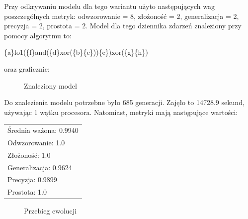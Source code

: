 Przy odkrywaniu modelu dla tego wariantu użyto następujących wag poszczególnych metryk: odwzorowanie = 8, złożoność = 2, generalizacja = 2, precyzja = 2, prostota = 2. Model dla tego dziennika zdarzeń znaleziony przy pomocy algorytmu to:
\begin{center}
	\{a\}lo1(\{f\}and(\{d\}xor(\{b\}\{c\}))\{e\})xor(\{g\}\{h\})
\end{center}
oraz graficznie:

\begin{figure}[H]
	\caption{\label{fig:flow_chart}Znaleziony model}
\end{figure}

Do znalezienia modelu potrzebne było 685 generacji. Zajęło to 14728.9 sekund, używając 1 wątku procesora. Natomiast, metryki mają następujące wartości: 

 \begin{center}
  \begin{tabular}{l}
	Średnia ważona: 0.9940 \\
	Odwzorowanie: 1.0 \\
	Złożoność: 1.0 \\
	Generalizacja: 0.9624 \\
	Precyzja: 0.9899 \\
	Prostota: 1.0
  \end{tabular}
 \end{center}
 
\begin{figure}[H]
	\caption{\label{fig:flow_chart}Przebieg ewolucji}
\end{figure}

